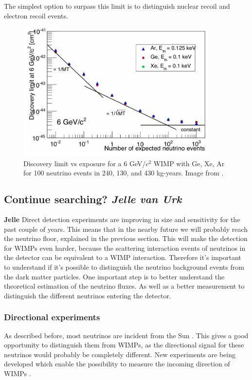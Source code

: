 \documentclass{article}
\begin{document}
The simplest option to surpass this limit is to distinguish nuclear recoil and electron recoil events. 


\begin{figure}[h]
    \centering
    \includegraphics[width=0.9\textwidth]{Discovery_limit.png}
    \caption{Discovery limit vs exposure for a 6 GeV/$c^2$ WIMP with Ge, Xe, Ar for 100 neutrino events in 240, 130, and 430 kg-years. Image from \cite{Billard:2013qya}.}
    \label{discovery_limit}
\end{figure}



\subsection{Continue searching? \small{\textit{Jelle van Urk}}}
\textbf{Jelle}
Direct detection experiments are improving in size and sensitivity for the past couple of years. This means that in the nearby future we will probably reach the neutrino floor, explained in the previous section. This will make the detection for WIMPs even harder, because the scattering interaction events of neutrinos in the detector can be equivalent to a WIMP interaction. Therefore  it's important to understand if it's possible to distinguish the neutrino background events from the dark matter particles. One important step is to better understand the theoretical estimation of the neutrino fluxes. As well as a better measurement to distinguish the different neutrinos entering the detector. 

\subsubsection{Directional experiments}
As described before, most neutrinos are incident from the Sun \cite{Billard:2013qya}. This gives a good opportunity to distinguish them from WIMPs, as the directional signal for these neutrinos would probably be completely different. New experiments are being developed which enable the possibility to measure the incoming direction of WIMPs \cite{Ahlen:2009ev}. 
\end{document}
